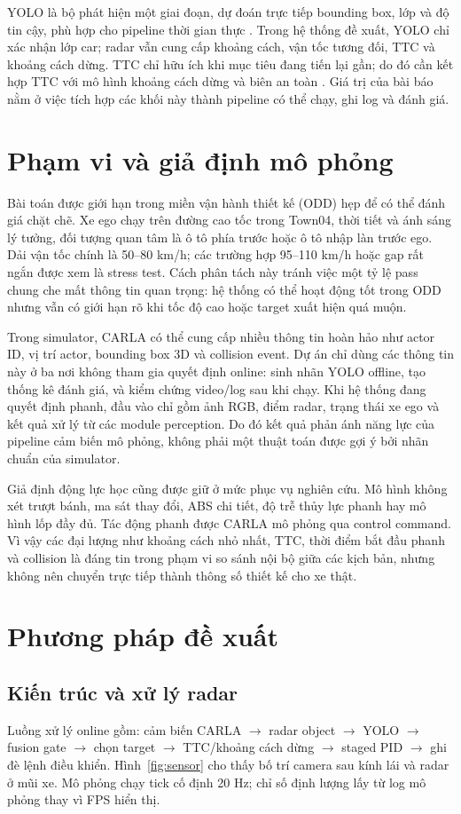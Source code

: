 \documentclass[conference]{IEEEtran}
\begin{document}
YOLO là bộ phát hiện một giai đoạn, dự đoán trực tiếp bounding box, lớp và độ tin cậy, phù hợp cho pipeline thời gian thực \cite{ultralytics_yolo}. Trong hệ thống đề xuất, YOLO chỉ xác nhận lớp car; radar vẫn cung cấp khoảng cách, vận tốc tương đối, TTC và khoảng cách dừng. TTC chỉ hữu ích khi mục tiêu đang tiến lại gần; do đó cần kết hợp TTC với mô hình khoảng cách dừng và biên an toàn \cite{iso15623}. Giá trị của bài báo nằm ở việc tích hợp các khối này thành pipeline có thể chạy, ghi log và đánh giá.

\section{Phạm vi và giả định mô phỏng}
Bài toán được giới hạn trong miền vận hành thiết kế (ODD) hẹp để có thể đánh giá chặt chẽ. Xe ego chạy trên đường cao tốc trong Town04, thời tiết và ánh sáng lý tưởng, đối tượng quan tâm là ô tô phía trước hoặc ô tô nhập làn trước ego. Dải vận tốc chính là 50--80 km/h; các trường hợp 95--110 km/h hoặc gap rất ngắn được xem là stress test. Cách phân tách này tránh việc một tỷ lệ pass chung che mất thông tin quan trọng: hệ thống có thể hoạt động tốt trong ODD nhưng vẫn có giới hạn rõ khi tốc độ cao hoặc target xuất hiện quá muộn.

Trong simulator, CARLA có thể cung cấp nhiều thông tin hoàn hảo như actor ID, vị trí actor, bounding box 3D và collision event. Dự án chỉ dùng các thông tin này ở ba nơi không tham gia quyết định online: sinh nhãn YOLO offline, tạo thống kê đánh giá, và kiểm chứng video/log sau khi chạy. Khi hệ thống đang quyết định phanh, đầu vào chỉ gồm ảnh RGB, điểm radar, trạng thái xe ego và kết quả xử lý từ các module perception. Do đó kết quả phản ánh năng lực của pipeline cảm biến mô phỏng, không phải một thuật toán được gợi ý bởi nhãn chuẩn của simulator.

Giả định động lực học cũng được giữ ở mức phục vụ nghiên cứu. Mô hình không xét trượt bánh, ma sát thay đổi, ABS chi tiết, độ trễ thủy lực phanh hay mô hình lốp đầy đủ. Tác động phanh được CARLA mô phỏng qua control command. Vì vậy các đại lượng như khoảng cách nhỏ nhất, TTC, thời điểm bắt đầu phanh và collision là đáng tin trong phạm vi so sánh nội bộ giữa các kịch bản, nhưng không nên chuyển trực tiếp thành thông số thiết kế cho xe thật.

\section{Phương pháp đề xuất}
\subsection{Kiến trúc và xử lý radar}
Luồng xử lý online gồm: cảm biến CARLA $\rightarrow$ radar object $\rightarrow$ YOLO $\rightarrow$ fusion gate $\rightarrow$ chọn target $\rightarrow$ TTC/khoảng cách dừng $\rightarrow$ staged PID $\rightarrow$ ghi đè lệnh điều khiển. Hình~\ref{fig:sensor} cho thấy bố trí camera sau kính lái và radar ở mũi xe. Mô phỏng chạy tick cố định 20 Hz; chỉ số định lượng lấy từ log mô phỏng thay vì FPS hiển thị.
\end{document}
